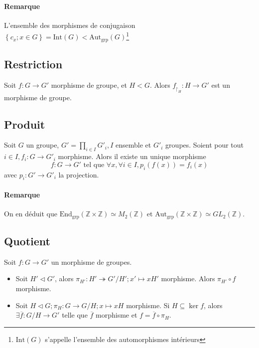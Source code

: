 \documentclass[a4paper,10pt]{report}
\newcommand{\set}[1]{\left\lbrace #1 \right\rbrace } %
\newcommand{\IZ}{\mathbb{Z}} %
\newcommand{\surj}{\twoheadrightarrow}
\newcommand{\rstrct}[2]{{ #1 }_{\upharpoonright_{ #2 }}} %
\newcommand{\mfootnote}[1]{\up{(}\footnote{#1}\up{)}}
\newcommand{\Autgrp}[1]{\text{Aut}_{\text{grp}}\left(#1\right)}
\newcommand{\Int}[1]{\text{Int}\left(#1\right)}
\newcommand{\Endgrp}[1]{\text{End}_{\text{grp}}\left(#1\right)}
\begin{document}
    \paragraph{Remarque}
     L'ensemble des morphismes de conjugaison $\set{c_x; x \in G}=\Int{G}
     < \Autgrp{G}$\footnote{$\Int{G}$ s'appelle l'ensemble des automorphismes
     intérieurs}
     \begin{comment}
       \mfootnote{$Preuve 19/11/08 p2, bas$}
     \end{comment}

   \subsection{Restriction}
    Soit $f:G \to G'$ morphisme de groupe, et $H < G$. Alors
    $\rstrct{f}{H} : H \to G'$ est un morphisme de groupe.

   \subsection{Produit}
    Soit $G$ un groupe, $\displaystyle G'=\prod_{i \in I} G'_i, I$ ensemble et
    $G'_i$ groupes. Soient pour tout $i\in I, f_i: G \to G'_i$ morphisme. Alors
    il existe un unique morphisme 
    $$f:G \to G' \text{ tel que } \forall x, \forall i \in I, p_i(f(x))=f_i(x)$$
    avec $p_i : G' \to G'_i$ la projection.

    \paragraph{Remarque} 
     On en déduit que $\Endgrp{\IZ \times \IZ} \simeq M_2(\IZ)$ et
     $\Autgrp{\IZ \times \IZ} \simeq GL_2(\IZ)$.

   \subsection{Quotient}
    Soit $f: G \to G'$ un morphisme de groupes.
    \begin{itemize}
      \item Soit $H' \triangleleft G'$, alors $\pi_{H'} : H' \surj G'/H'; x' \mapsto
	xH'$ morphisme. Alors $\pi_{H'} \circ f$ morphisme.
      \item Soit $H \triangleleft G; \pi_H: G \to G/H; x \mapsto xH$ morphisme.
	Si $H \subseteq \ker f$, alors $\exists \overline{f}: G/H \to G'$ telle
	que $\overline{f}$ morphisme et $f=\overline{f} \circ \pi_H$.
    \end{itemize}
\end{document}
